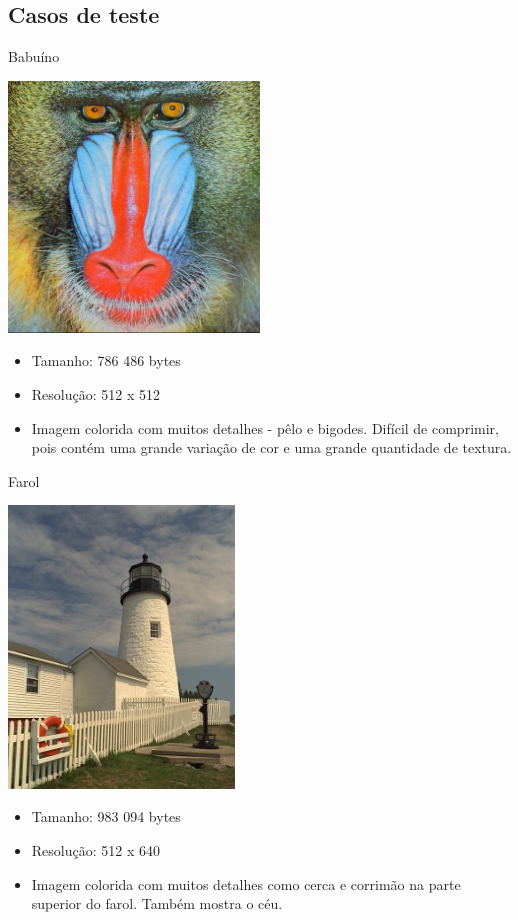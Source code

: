 \documentclass{beamer}
\begin{document}
\subsection{Casos de teste}
\begin{frame}{Babuíno}
   \begin{multicols}{2}
      \includegraphics[width=0.5\textwidth]{figure/baboon100.jpg}
      \begin{itemize}
         \item Tamanho: 786 486 bytes
         \item Resolução: 512 x 512
         \item Imagem colorida com muitos detalhes - pêlo e bigodes. Difícil de comprimir, pois contém uma grande variação de cor e uma grande quantidade de textura.
      \end{itemize}
   \end{multicols}
\end{frame}
\begin{frame}{Farol}
   \begin{multicols}{2}
      \includegraphics[width=0.45\textwidth]{figure/lighthouse100.jpg}
      \begin{itemize}
         \item Tamanho: 983 094 bytes
         \item Resolução: 512 x 640
         \item Imagem colorida com muitos detalhes como cerca e corrimão na parte superior do farol. Também mostra o céu.
      \end{itemize}
   \end{multicols}
\end{frame}
\end{document}
